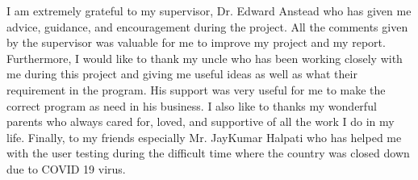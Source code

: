 I am extremely grateful to my supervisor, Dr. Edward Anstead who has given me advice, guidance, and encouragement during the project. All the comments given by the supervisor was valuable for me to improve my project and my report. Furthermore, I would like to thank my uncle who has been working closely with me during this project and giving me useful ideas as well as what their requirement in the program. His support was very useful for me to make the correct program as need in his business. I also like to thanks my wonderful parents who always cared for, loved, and supportive of all the work I do in my life.
\newline
\newline 
Finally, to my friends especially Mr. JayKumar Halpati who has helped me with the user testing during the difficult time where the country was closed down due to COVID 19 virus.